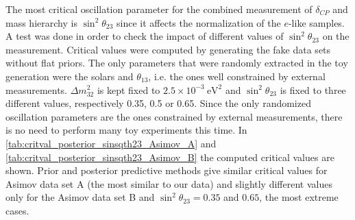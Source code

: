 The most critical oscillation parameter for the combined measurement of  $\delta_{CP}$ and mass hierarchy
is $\sin^2 \theta_{23}$ since it affects the normalization of the $e$-like samples. %
A test was done in order to check the impact of different values of $\sin^2 \theta_{23}$ on the measurement.
Critical values were computed by generating the fake data sets without flat priors.
The only parameters that were randomly extracted in the toy generation were the solars and $\theta_{13}$,
i.e. the ones well constrained by external measurements. 
$\Delta m^2_{32}$ is kept fixed to $2.5 \times 10^{-3}~\text{eV}^2$ and 
$\sin^2 \theta_{23}$ is fixed to three different values, respectively 0.35, 0.5 or 0.65.
Since the only randomized oscillation parameters are the ones constrained by external measurements, 
there is no need to perform many toy experiments this time.
In \cref{tab:critval_posterior_sinsqth23_Asimov_A} and \cref{tab:critval_posterior_sinsqth23_Asimov_B}
the computed critical values are shown. 
Prior and posterior predictive methods give similar critical values for Asimov data set A (the most similar to our data)
and slightly different values only for the Asimov data set B
and $\sin^2 \theta_{23} = 0.35$ and $0.65$, the most extreme cases.

